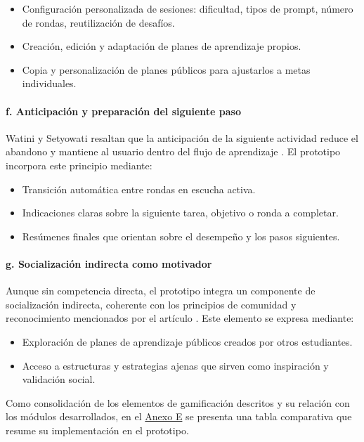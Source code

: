 \begin{itemize}
    \item Configuración personalizada de sesiones: dificultad, tipos de prompt, número de rondas, reutilización de desafíos.
    \item Creación, edición y adaptación de planes de aprendizaje propios.
    \item Copia y personalización de planes públicos para ajustarlos a metas individuales.
\end{itemize}

\paragraph{f. Anticipación y preparación del siguiente paso}

Watini y Setyowati resaltan que la anticipación de la siguiente actividad reduce el abandono y mantiene al usuario dentro del flujo de aprendizaje \cite{watini2023gamification}. El prototipo incorpora este principio mediante:

\begin{itemize}
    \item Transición automática entre rondas en escucha activa.
    \item Indicaciones claras sobre la siguiente tarea, objetivo o ronda a completar.
    \item Resúmenes finales que orientan sobre el desempeño y los pasos siguientes.
\end{itemize}

\paragraph{g. Socialización indirecta como motivador}

Aunque sin competencia directa, el prototipo integra un componente de socialización indirecta, coherente con los principios de comunidad y reconocimiento mencionados por el artículo \cite{watini2023gamification}. Este elemento se expresa mediante:

\begin{itemize}
    \item Exploración de planes de aprendizaje públicos creados por otros estudiantes.
    \item Acceso a estructuras y estrategias ajenas que sirven como inspiración y validación social.
\end{itemize}

Como consolidación de los elementos de gamificación descritos y su relación con los módulos desarrollados, en el \hyperref[anexo:gamificacion]{Anexo E} se presenta una tabla comparativa que resume su implementación en el prototipo.